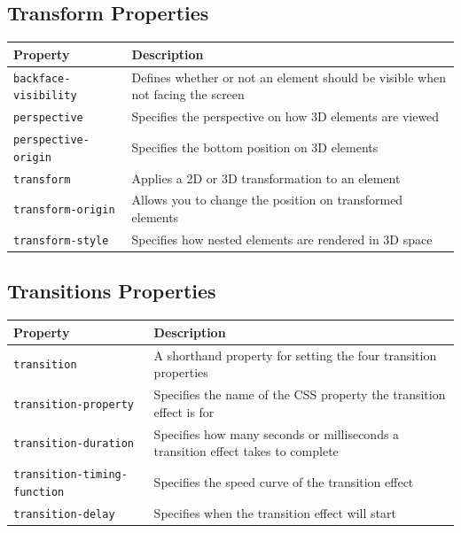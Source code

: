 \documentclass[11pt, letterpaper]{article}
\begin{document}
		\subsection{Transform Properties}
			\begin{longtable}{p{5cm} p{10cm}}
				\toprule
				Property & Description \\\midrule 
				\texttt{backface-visibility} & Defines whether or not an element should be visible when not facing the screen \\\midrule
				\texttt{perspective} & Specifies the perspective on how 3D elements are viewed \\\midrule
				\texttt{perspective-origin} & Specifies the bottom position on 3D elements \\\midrule
				\texttt{transform} & Applies a 2D or 3D transformation to an element \\\midrule
				\texttt{transform-origin} & Allows you to change the position on transformed elements \\\midrule
				\texttt{transform-style} & Specifies how nested elements are rendered in 3D space \\\midrule
			\end{longtable}

		\subsection{Transitions Properties}
			\begin{longtable}{p{5cm} p{10cm}}
				\toprule
				Property & Description \\\midrule 
				\texttt{transition} & A shorthand property for setting the four transition properties \\\midrule
				\texttt{transition-property} & Specifies the name of the CSS property the transition effect is for \\\midrule
				\texttt{transition-duration} & Specifies how many seconds or milliseconds a transition effect takes to complete \\\midrule
				\texttt{transition-timing-function} & Specifies the speed curve of the transition effect \\\midrule
				\texttt{transition-delay} & Specifies when the transition effect will start \\\midrule
			\end{longtable}
\end{document}
